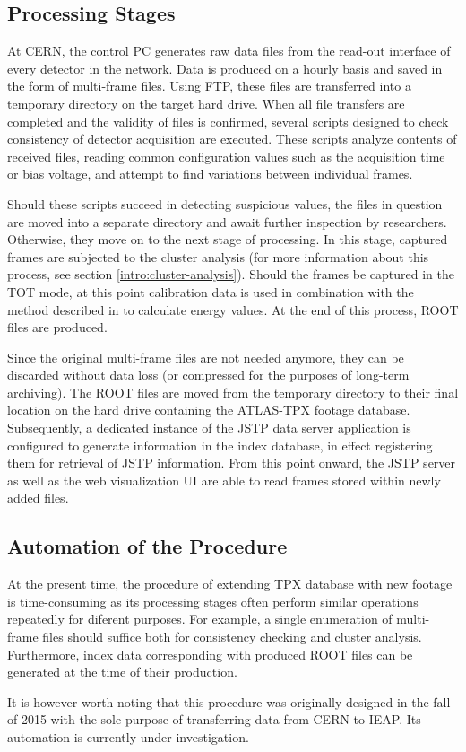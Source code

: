 \subsection{Processing Stages}
At CERN, the control PC generates raw data files from the read-out interface of every detector in the network. Data is produced on a hourly basis and saved in the form of multi-frame files. Using FTP, these files are transferred into a temporary directory on the target hard drive. When all file transfers are completed and the validity of files is confirmed, several scripts designed to check consistency of detector acquisition are executed. These scripts analyze contents of received files, reading common configuration values such as the acquisition time or bias voltage, and attempt to find variations between individual frames.

Should these scripts succeed in detecting suspicious values, the files in question are moved into a separate directory and await further inspection by researchers. Otherwise, they move on to the next stage of processing. In this stage, captured frames are subjected to the cluster analysis (for more information about this process, see section \ref{intro:cluster-analysis}). Should the frames be captured in the TOT mode, at this point calibration data is used in combination with the method described in \cite{Jakubek2011S262} to calculate energy values. At the end of this process, ROOT files are produced.

Since the original multi-frame files are not needed anymore, they can be discarded without data loss (or compressed for the purposes of long-term archiving). The ROOT files are moved from the temporary directory to their final location on the hard drive containing the ATLAS-TPX footage database. Subsequently, a dedicated instance of the JSTP data server application is configured to generate information in the index database, in effect registering them for retrieval of JSTP information. From this point onward, the JSTP server as well as the web visualization UI are able to read frames stored within newly added files.

\subsection{Automation of the Procedure}
\label{import-automation}
At the present time, the procedure of extending TPX database with new footage is time-consuming as its processing stages often perform similar operations repeatedly for diferent purposes. For example, a single enumeration of multi-frame files should suffice both for consistency checking and cluster analysis. Furthermore, index data corresponding with produced ROOT files can be generated at the time of their production.

It is however worth noting that this procedure was originally designed in the fall of 2015 with the sole purpose of transferring data from CERN to IEAP. Its automation is currently under investigation.
